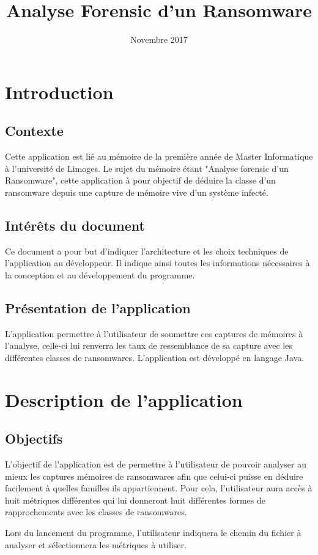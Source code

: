\documentclass[a4paper, 12pt, twoside]{article}
\author{}
\title{Analyse Forensic d'un Ransomware}
\date{Novembre 2017}
\begin{document}
\pagedegarde
\tableofcontents
\section{Introduction}
\subsection{Contexte}
Cette application est lié au mémoire de la première année de Master Informatique à l'université de Limoges. Le sujet du mémoire étant "Analyse forensic d'un Ransomware", cette application à pour objectif de déduire la classe d'un ransomware depuis une capture de mémoire vive d'un système infecté.

\subsection{Intérêts du document}
Ce document a pour but d'indiquer l'architecture et les choix techniques de l'application au développeur. Il indique ainsi toutes les informations nécessaires à la conception et au développement du programme. 

\subsection{Présentation de l'application}
L'application permettre à l'utilisateur de soumettre ces captures de mémoires à l'analyse, celle-ci lui renverra les taux de ressemblance de sa capture avec les différentes classes de ransomwares.
L'application est développé en langage Java.

\section{Description de l'application}
\subsection{Objectifs}
L'objectif de l'application est de permettre à l'utilisateur de pouvoir analyser au mieux les captures mémoires de ransomwares afin que celui-ci puisse en déduire facilement à quelles familles ils appartiennent. Pour cela, l'utilisateur aura accès à huit métriques différentes qui lui donneront huit différentes formes de rapprochements avec les classes de ransomwares.

Lors du lancement du programme, l'utilisateur indiquera le chemin 
du fichier à analyser et sélectionnera les métriques à utiliser.
\end{document}
